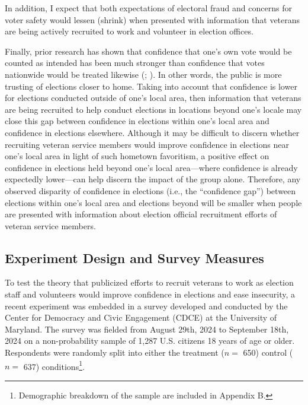 \documentclass[
  12pt,
  letterpaper,
]{article}
\begin{document}
In addition, I expect that both expectations of electoral fraud and
concerns for voter safety would lessen (shrink) when presented with
information that veterans are being actively recruited to work and
volunteer in election offices.

Finally, prior research has shown that confidence that one's own vote
would be counted as intended has been much stronger than confidence that
votes nationwide would be treated likewise
(;
). In other words, the public is
more trusting of elections closer to home. Taking into account that
confidence is lower for elections conducted outside of one's local area,
then information that veterans are being recruited to help conduct
elections in locations beyond one's locale may close this gap between
confidence in elections within one's local area and confidence in
elections elsewhere. Although it may be difficult to discern whether
recruiting veteran service members would improve confidence in elections
near one's local area in light of such hometown favoritism, a positive
effect on confidence in elections held beyond one's local area---where
confidence is already expectedly lower---can help discern the impact of
the group alone. Therefore, any observed disparity of confidence in
elections (i.e., the ``confidence gap'') between elections within one's
local area and elections beyond will be smaller when people are
presented with information about election official recruitment efforts
of veteran service members.

\subsection{Experiment Design and Survey
Measures}\label{experiment-design-and-survey-measures}

To test the theory that publicized efforts to recruit veterans to work
as election staff and volunteers would improve confidence in elections
and ease insecurity, a recent experiment was embedded in a survey
developed and conducted by the Center for Democracy and Civic Engagement
(CDCE) at the University of Maryland. The survey was fielded from August
29th, 2024 to September 18th, 2024 on a non-probability sample of 1,287
U.S. citizens 18 years of age or older. Respondents were randomly split
into either the treatment (\(n =\) 650) control (\(n =\) 637)
conditions\footnote{Demographic breakdown of the sample are included in
  Appendix B.}.
\end{document}
